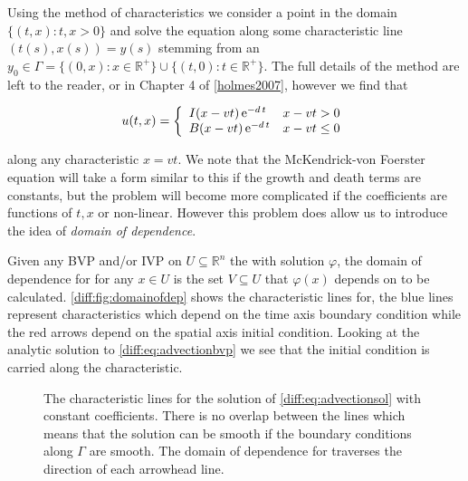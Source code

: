 \documentclass[../main.tex]{subfiles}
\begin{document}
  Using the method of characteristics we consider a point in the domain $\{(t, x) : t, x > 0 \}$ and solve the equation along some characteristic line $(t(s), x(s)) = y(s)$ stemming from an $y_0 \in \Gamma = \{ (0, x) : x \in \mathbb{R}^+ \} \cup \{ (t, 0) : t \in \mathbb{R}^+ \}$. The full details of the method are left to the reader, or in Chapter 4 of \autoref{holmes2007}, however we find that

  \begin{equation} \label{diff:eq:advectionsol}
    u(t, x) = \left\lbrace \begin{array}{ll}
      I(x - v t) \operatorname{e}^{-d \, t} & x - vt > 0 \\
      B(x - v t) \operatorname{e}^{-d \, t} & x - vt \leq 0 \\
  \end{array} \right.
  \end{equation}

  along any characteristic $x = vt$. We note that the McKendrick-von Foerster equation will take a form similar to this if the growth and death terms are constants, but the problem will become more complicated if the coefficients are functions of $t, x$ or non-linear. However this problem does allow us to introduce the idea of \emph{domain of dependence}.

  Given any BVP and/or IVP on $U \subseteq \mathbb{R}^n$ the with solution $\varphi$, the domain of dependence for for any $x \in U$ is the set $V \subseteq U$ that $\varphi(x)$ depends on to be calculated. \autoref{diff:fig:domainofdep} shows the characteristic lines for, the blue lines represent characteristics which depend on the time axis boundary condition while the red arrows depend on the spatial axis initial condition. Looking at the analytic solution to \autoref{diff:eq:advectionbvp} we see that the initial condition is carried along the characteristic.

  \begin{figure}[htb]
    \centering

    \caption{The characteristic lines for the solution of \autoref{diff:eq:advectionsol} with constant coefficients. There is no overlap between the lines which means that the solution can be smooth if the boundary conditions along $\Gamma$ are smooth. The domain of dependence for traverses the direction of each arrowhead line. \label{diff:fig:domainofdep}}
  \end{figure}
\end{document}
